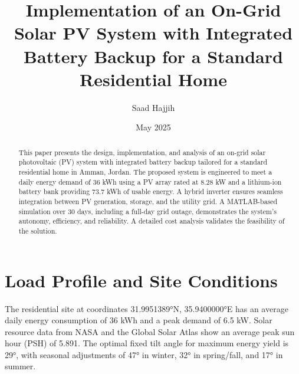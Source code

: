 \documentclass{article}
\title{Implementation of an On-Grid Solar PV System with Integrated Battery Backup for a Standard Residential Home}
\author{Saad Hajjih}
\date{May 2025}
\begin{document}
\maketitle
\tableofcontents
\listoffigures
\listoftables

\newpage
\begin{abstract}
This paper presents the design, implementation, and analysis of an on-grid solar photovoltaic (PV) system with integrated battery backup tailored for a standard residential home in Amman, Jordan. The proposed system is engineered to meet a daily energy demand of 36 kWh using a PV array rated at 8.28 kW and a lithium-ion battery bank providing 73.7 kWh of usable energy. A hybrid inverter ensures seamless integration between PV generation, storage, and the utility grid. A MATLAB-based simulation over 30 days, including a full-day grid outage, demonstrates the system's autonomy, efficiency, and reliability. A detailed cost analysis validates the feasibility of the solution.
\end{abstract}

\section{Load Profile and Site Conditions}
The residential site at coordinates 31.9951389°N, 35.9400000°E has an average daily energy consumption of 36 kWh and a peak demand of 6.5 kW. Solar resource data from NASA and the Global Solar Atlas show an average peak sun hour (PSH) of 5.891. The optimal fixed tilt angle for maximum energy yield is 29°, with seasonal adjustments of 47° in winter, 32° in spring/fall, and 17° in summer.
\end{document}
